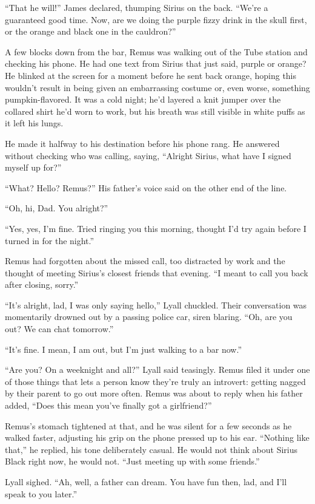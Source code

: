 “That he will!” James declared, thumping Sirius on the back. “We’re a guaranteed good time. Now, are we doing the purple fizzy drink in the skull first, or the orange and black one in the cauldron?”

A few blocks down from the bar, Remus was walking out of the Tube station and checking his phone. He had one text from Sirius that just said, purple or orange? He blinked at the screen for a moment before he sent back orange, hoping this wouldn’t result in being given an embarrassing costume or, even worse, something pumpkin-flavored. It was a cold night; he’d layered a knit jumper over the collared shirt he’d worn to work, but his breath was still visible in white puffs as it left his lungs.

He made it halfway to his destination before his phone rang. He answered without checking who was calling, saying, “Alright Sirius, what have I signed myself up for?”

“What? Hello? Remus?” His father’s voice said on the other end of the line.

“Oh, hi, Dad. You alright?”

“Yes, yes, I’m fine. Tried ringing you this morning, thought I’d try again before I turned in for the night.”

Remus had forgotten about the missed call, too distracted by work and the thought of meeting Sirius’s closest friends that evening. “I meant to call you back after closing, sorry.”

“It’s alright, lad, I was only saying hello,” Lyall chuckled. Their conversation was momentarily drowned out by a passing police car, siren blaring. “Oh, are you out? We can chat tomorrow.”

“It’s fine. I mean, I am out, but I’m just walking to a bar now.”

“Are you? On a weeknight and all?” Lyall said teasingly. Remus filed it under one of those things that lets a person know they’re truly an introvert: getting nagged by their parent to go out more often. Remus was about to reply when his father added, “Does this mean you’ve finally got a girlfriend?”

Remus’s stomach tightened at that, and he was silent for a few seconds as he walked faster, adjusting his grip on the phone pressed up to his ear. “Nothing like that,” he replied, his tone deliberately casual. He would not think about Sirius Black right now, he would not. “Just meeting up with some friends.”

Lyall sighed. “Ah, well, a father can dream. You have fun then, lad, and I’ll speak to you later.”


